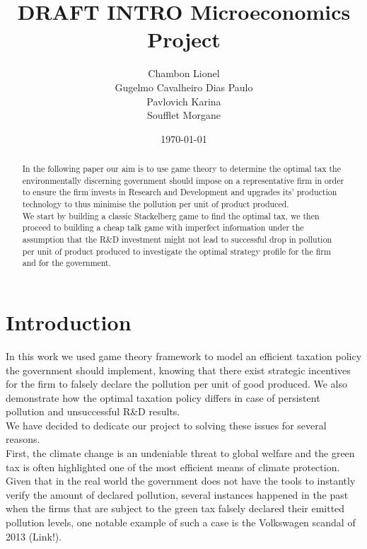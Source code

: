 \documentclass{article}
\title{DRAFT INTRO Microeconomics Project}
\author{Chambon Lionel \\ Gugelmo Cavalheiro Dias Paulo \\ Pavlovich Karina \\ Soufflet Morgane}
\date{\today}
\begin{document}
\maketitle

\begin{abstract}
    In the following paper our aim is to use game theory to determine the optimal tax the environmentally discerning government should impose on a representative firm in order to ensure the firm invests in Research and Development and upgrades its' production technology to thus minimise the pollution per unit of product produced. \\

    We start by building a classic Stackelberg game to find the optimal tax, we then proceed to building a cheap talk game with imperfect information under the assumption that the R\&D investment might not lead to successful drop in pollution per unit of product produced to investigate the optimal strategy profile for the firm and for the government.  
\end{abstract}

\pagebreak
\tableofcontents
\pagebreak

\section{Introduction}

In this work we used game theory framework to model an efficient taxation policy the government should implement, knowing that there exist strategic incentives for the firm to falsely declare the pollution per unit of good produced. We also demonstrate how the optimal taxation policy differs in case of persistent pollution and unsuccessful R\&D results. \\

We have decided to dedicate our project to solving these issues for several reasons. \\

First, the climate change is an undeniable threat to global welfare and the green tax is often highlighted one of the most efficient means of climate protection.\\

Given that in the real world the government does not have the tools to instantly verify the amount of declared pollution, several instances happened in the past when the firms that are subject to the green tax falsely declared their emitted pollution levels, one notable example of such a case is the Volkswagen scandal of 2013 (Link!). \\
\end{document}
